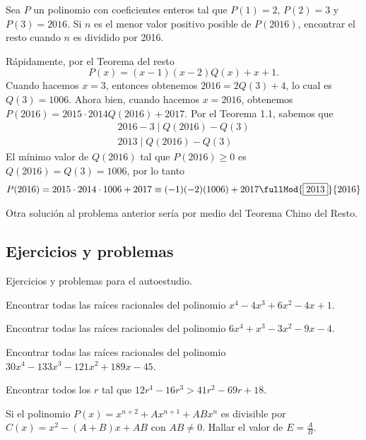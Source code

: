 \begin{example}
    Sea $P$ un polinomio con coeficientes enteros tal que $P(1) = 2$, $P(2) = 3$ y $P(3) = 2016$.
    Si $n$ es el menor valor positivo posible de $P(2016)$, encontrar el resto cuando $n$ es dividido por 2016.
\end{example}
\begin{solution}
    Rápidamente, por el Teorema del resto
    \[
        P(x) = (x - 1)(x - 2)Q(x) + x + 1.
    \]
    Cuando hacemos $x = 3$, entonces obtenemos $2016 = 2Q(3) + 4$, lo cual es $Q(3) = 1006$.
    Ahora bien, cuando hacemos $x = 2016$, obtenemos $P(2016) = 2015\cdot2014Q(2016) + 2017$.
    Por el Teorema 1.1, sabemos que
    \begin{gather*}
        2016 - 3 \mid Q(2016) - Q(3)\\
        2013 \mid Q(2016) - Q(3)
    \end{gather*}
    El mínimo valor de $Q(2016)$ tal que $P(2016) \geq 0$ es $Q(2016) = Q(3) = 1006$, por lo tanto
    \begin{gather*}
        P(2016) = 2015\cdot2014\cdot1006 + 2017 \equiv (-1)(-2)(1006) + 2017 \fullMod{\boxed{2013}}{2016}
    \end{gather*}
\end{solution}
Otra solución al problema anterior sería por medio del Teorema Chino del Resto.



\subsection{Ejercicios y problemas}

Ejercicios y problemas para el autoestudio.

\showLine
\begin{multicols}{2}
    \begin{problem}
        Encontrar todas las raíces racionales del polinomio $x^4 - 4x^3 + 6x^2 - 4x + 1$.
    \end{problem}

    \begin{problem}
        Encontrar todas las raíces racionales del polinomio $6x^4 + x^3 - 3x^2 - 9x - 4$.
    \end{problem}

    \begin{problem}
        Encontrar todas las raíces racionales del polinomio $30x^4 - 133 x^3 - 121x^2 + 189x - 45$.
    \end{problem}

    \begin{problem}
        Encontrar todos los $r$ tal que $12r^4 - 16r^3 > 41r^2 - 69r + 18$.
    \end{problem}

    \begin{problem}
        Si el polinomio $P(x) = x^{n + 2} + Ax^{n + 1} + ABx^n$ es divisible por $C(x) = x^2 - (A + B)x + AB$ con $AB \neq 0$.
        Hallar el valor de $E = \frac{A}{B}$.
    \end{problem}
\end{multicols}